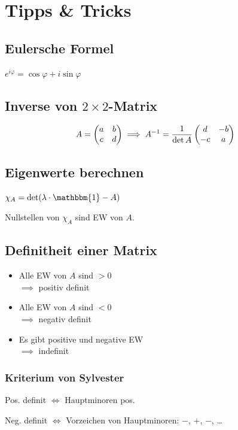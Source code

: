 \section*{Tipps \& Tricks}

\subsection*{Eulersche Formel}
$e^{i\varphi} = \cos\varphi + i \sin\varphi$

\subsection*{Inverse von $2\times2$-Matrix}
\[A = \begin{pmatrix} a & b \\ c & d \end{pmatrix} \implies A^{-1} = \frac{1}{\det A}\begin{pmatrix} d & -b \\ -c & a \end{pmatrix}\]

\subsection*{Eigenwerte berechnen}
$\chi_A = \det(\lambda \cdot \mathbbm{1} - A)$

Nullstellen von $\chi_A$ sind EW von $A$.

\subsection*{Definitheit einer Matrix}
\begin{itemize}
	\item Alle EW von $A$ sind $> 0$ \\
		$\implies$ positiv definit
	\item Alle EW von $A$ sind $< 0$ \\
		$\implies$ negativ definit
	\item Es gibt positive und negative EW \\
		$\implies$ indefinit
\end{itemize}

\subsubsection*{Kriterium von Sylvester}
Pos. definit $\iff$ Hauptminoren pos.

Neg. definit $\iff$ Vorzeichen von Hauptminoren: $-$, $+$, $-$, \ldots
